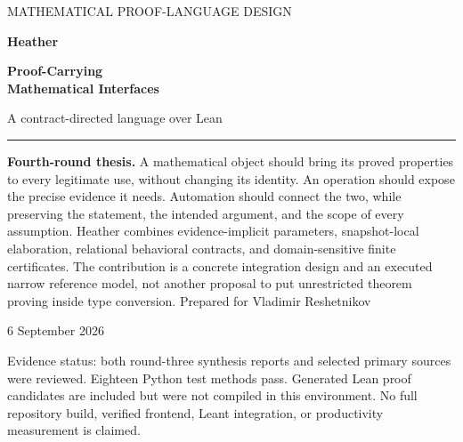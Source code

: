 \documentclass[11pt,letterpaper]{article}
\theoremstyle{definition}\newtheorem{definition}[theorem]{Definition}
\theoremstyle{remark}\newtheorem{remark}[theorem]{Remark}
\begin{document}
\hypersetup{pageanchor=false}
\begin{titlepage}
\vspace*{12mm}
{\sffamily\large\color{heather}MATHEMATICAL PROOF-LANGUAGE DESIGN\par}
\vspace{18mm}
{\sffamily\bfseries\color{heather}\fontsize{46}{50}\selectfont Heather\par}
\vspace{8mm}
{\sffamily\bfseries\fontsize{25}{30}\selectfont Proof-Carrying\\Mathematical Interfaces\par}
\vspace{8mm}
{\sffamily\Large A contract-directed language over Lean\par}
\vspace{13mm}
\hrule\vspace{5mm}
\textbf{Fourth-round thesis.} A mathematical object should bring its proved
properties to every legitimate use, without changing its identity. An operation
should expose the precise evidence it needs. Automation should connect the two,
while preserving the statement, the intended argument, and the scope of every
assumption.
\vspace{7mm}
Heather combines evidence-implicit parameters, snapshot-local elaboration,
relational behavioral contracts, and domain-sensitive finite certificates.
The contribution is a concrete integration design and an executed narrow
reference model, not another proposal to put unrestricted theorem proving
inside type conversion.
\vfill
Prepared for Vladimir Reshetnikov\par
6 September 2026\par
\vspace{5mm}
{\small\color{muted}Evidence status: both round-three synthesis reports and selected
primary sources were reviewed. Eighteen Python test methods pass. Generated Lean
proof candidates are included but were not compiled in this environment.
No full repository build, verified frontend, Leant integration, or productivity
measurement is claimed.}
\end{titlepage}
\hypersetup{pageanchor=true}
\end{document}
